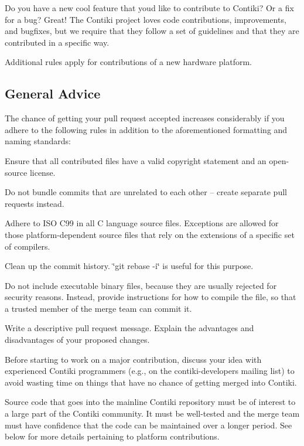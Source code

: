 Do you have a new cool feature that you\textquotesingle{}d like to contribute to Contiki? Or a fix for a bug? Great! The Contiki project loves code contributions, improvements, and bugfixes, but we require that they follow a set of guidelines and that they are contributed in a specific way.

Additional rules apply for contributions of a new hardware platform.

\subsection*{General Advice }

The chance of getting your pull request accepted increases considerably if you adhere to the following rules in addition to the aforementioned formatting and naming standards\+:


\begin{DoxyItemize}
\item Ensure that all contributed files have a valid copyright statement and an open-\/source license.
\item Do not bundle commits that are unrelated to each other -- create separate pull requests instead.
\item Adhere to I\+S\+O C99 in all C language source files. Exceptions are allowed for those platform-\/dependent source files that rely on the extensions of a specific set of compilers.
\item Clean up the commit history. \char`\"{}git rebase -\/i\char`\"{} is useful for this purpose.
\item Do not include executable binary files, because they are usually rejected for security reasons. Instead, provide instructions for how to compile the file, so that a trusted member of the merge team can commit it.
\item Write a descriptive pull request message. Explain the advantages and disadvantages of your proposed changes.
\item Before starting to work on a major contribution, discuss your idea with experienced Contiki programmers (e.\+g., on the contiki-\/developers mailing list) to avoid wasting time on things that have no chance of getting merged into Contiki.
\end{DoxyItemize}

Source code that goes into the mainline Contiki repository must be of interest to a large part of the Contiki community. It must be well-\/tested and the merge team must have confidence that the code can be maintained over a longer period. See below for more details pertaining to platform contributions.

